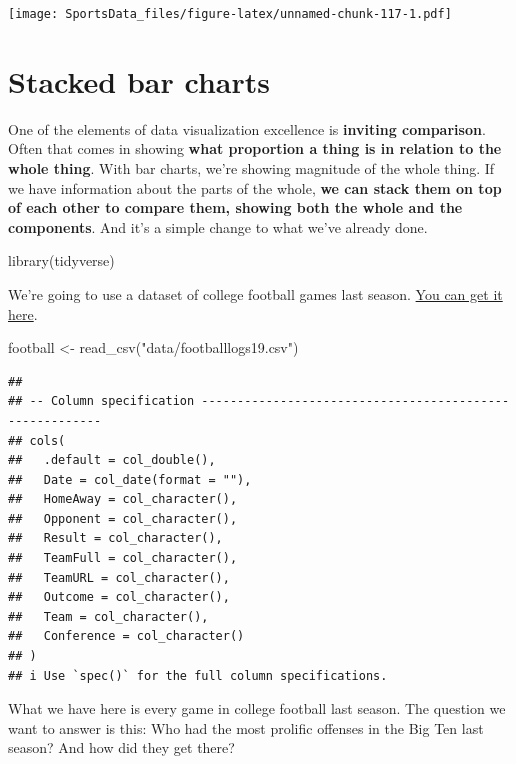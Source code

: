 \documentclass[
]{book}
\newenvironment{Shaded}{\begin{snugshade}}{\end{snugshade}}
\newcommand{\FunctionTok}[1]{\textcolor[rgb]{0.00,0.00,0.00}{#1}}
\newcommand{\NormalTok}[1]{#1}
\newcommand{\OtherTok}[1]{\textcolor[rgb]{0.56,0.35,0.01}{#1}}
\newcommand{\StringTok}[1]{\textcolor[rgb]{0.31,0.60,0.02}{#1}}
\begin{document}
\texttt{[image: SportsData\_files/figure-latex/unnamed-chunk-117-1.pdf]}

\hypertarget{stacked-bar-charts}{%
\chapter{Stacked bar charts}\label{stacked-bar-charts}}

One of the elements of data visualization excellence is \textbf{inviting comparison}. Often that comes in showing \textbf{what proportion a thing is in relation to the whole thing}. With bar charts, we're showing magnitude of the whole thing. If we have information about the parts of the whole, \textbf{we can stack them on top of each other to compare them, showing both the whole and the components}. And it's a simple change to what we've already done.

\begin{Shaded}
\begin{Highlighting}[]
\FunctionTok{library}\NormalTok{(tidyverse)}
\end{Highlighting}
\end{Shaded}

We're going to use a dataset of college football games last season. \href{https://unl.box.com/s/2prgq48ctoxlukn6kmfjw0u1opda5s0m}{You can get it here}.

\begin{Shaded}
\begin{Highlighting}[]
\NormalTok{football }\OtherTok{\textless{}{-}} \FunctionTok{read\_csv}\NormalTok{(}\StringTok{"data/footballlogs19.csv"}\NormalTok{)}
\end{Highlighting}
\end{Shaded}

\begin{verbatim}
## 
## -- Column specification --------------------------------------------------------
## cols(
##   .default = col_double(),
##   Date = col_date(format = ""),
##   HomeAway = col_character(),
##   Opponent = col_character(),
##   Result = col_character(),
##   TeamFull = col_character(),
##   TeamURL = col_character(),
##   Outcome = col_character(),
##   Team = col_character(),
##   Conference = col_character()
## )
## i Use `spec()` for the full column specifications.
\end{verbatim}

What we have here is every game in college football last season. The question we want to answer is this: Who had the most prolific offenses in the Big Ten last season? And how did they get there?
\end{document}
